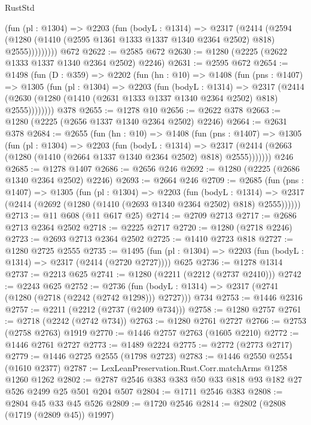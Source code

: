 \begin{lexlean}{RustStd}
\begin{coremodule}
            (fun (pl : @1304) =>
            @2203
              (fun (bodyL : @1314) =>
              @2317
                (@2414
                  (@2594
                    (@1280 (@1410 (@2595 @1361 @1333 @1337 @1340 @2364 @2502) @818) @2555)))))))))
    @672
@2622 := @2585 @672
@2630 := @1280 (@2225 (@2622 @1333 @1337 @1340 @2364 @2502) @2246)
@2631 := @2595 @672
@2654 := @1498
    (fun (D : @359) =>
    @2202
      (fun (hn : @10) =>
      @1408
        (fun (pns : @1407) =>
        @1305
          (fun (pl : @1304) =>
          @2203
            (fun (bodyL : @1314) =>
            @2317
              (@2414 (@2630 (@1280 (@1410 (@2631 @1333 @1337 @1340 @2364 @2502) @818) @2555))))))))
    @378
@2655 := @1278 @10
@2656 := @2622 @378
@2663 := @1280 (@2225 (@2656 @1337 @1340 @2364 @2502) @2246)
@2664 := @2631 @378
@2684 := @2655
    (fun (hn : @10) =>
    @1408
      (fun (pns : @1407) =>
      @1305
        (fun (pl : @1304) =>
        @2203
          (fun (bodyL : @1314) =>
          @2317 (@2414 (@2663 (@1280 (@1410 (@2664 @1337 @1340 @2364 @2502) @818) @2555)))))))
    @246
@2685 := @1278 @1407
@2686 := @2656 @246
@2692 := @1280 (@2225 (@2686 @1340 @2364 @2502) @2246)
@2693 := @2664 @246
@2709 := @2685
    (fun (pns : @1407) =>
    @1305
      (fun (pl : @1304) =>
      @2203
        (fun (bodyL : @1314) =>
        @2317 (@2414 (@2692 (@1280 (@1410 (@2693 @1340 @2364 @2502) @818) @2555))))))
@2713 := @11 @608 (@11 @617 @25)
@2714 := @2709 @2713
@2717 := @2686 @2713 @2364 @2502
@2718 := @2225 @2717
@2720 := @1280 (@2718 @2246)
@2723 := @2693 @2713 @2364 @2502
@2725 := @1410 @2723 @818
@2727 := @1280 @2725 @2555
@2735 := @1495 (fun (pl : @1304) => @2203 (fun (bodyL : @1314) => @2317 (@2414 (@2720 @2727)))) @625
@2736 := @1278 @1314
@2737 := @2213 @625
@2741 := @1280 (@2211 (@2212 (@2737 @2410)))
@2742 := @2243 @625
@2752 := @2736
    (fun (bodyL : @1314) => @2317 (@2741 (@1280 (@2718 (@2242 (@2742 @1298))) @2727)))
    @734
@2753 := @1446 @2316
@2757 := @2211 (@2212 (@2737 (@2409 @734)))
@2758 := @1280 @2757
@2761 := @2718 (@2242 (@2742 @734))
@2763 := @1280 @2761 @2727
@2766 := @2753 (@2758 @2763) @1919
@2770 := @1446 @2757 @2763 (@1605 @2210)
@2772 := @1446 @2761 @2727
@2773 := @1489 @2224
@2775 := @2772 (@2773 @2717)
@2779 := @1446 @2725 @2555 (@1798 @2723)
@2783 := @1446 @2550 @2554 (@1610 @2377)
@2787 := LexLeanPreservation.Rust.Corr.matchArms @1258 @1260 @1262
@2802 := @2787 @2546 @383 @383 @50 @33 @818 @93 @182 @27 @526 @2499 @25 @501 @204 @507
@2804 := @1711 @2546 @383
@2808 := @2804 @45 @33 @45 @526
@2809 := @1720 @2546
@2814 := @2802 (@2808 (@1719 (@2809 @45)) @1997)

\end{coremodule}
\end{lexlean}

